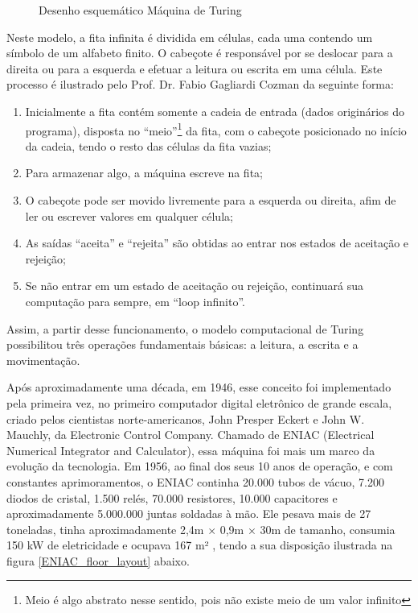 \vspace{1cm}
\begin{figure}[H] \centering 
  \caption{\label{turing_machine} Desenho esquemático Máquina de Turing} 
\end{figure}

Neste modelo, a fita infinita é dividida em células, cada uma contendo um símbolo de um alfabeto finito. O cabeçote é responsável por se deslocar para a direita ou para a esquerda e efetuar a leitura ou escrita em uma célula. Este processo é ilustrado pelo Prof. Dr. Fabio Gagliardi Cozman \cite{7} da seguinte forma:

\begin{enumerate}
  \item Inicialmente a fita contém somente a cadeia de entrada (dados originários do programa), disposta no ``meio''\footnote{Meio é algo abstrato nesse sentido, pois não existe meio de um valor infinito} da fita, com o cabeçote posicionado no início da cadeia, tendo o resto das células da fita vazias;
  \item Para armazenar algo, a máquina escreve na fita;
  \item O cabeçote pode ser movido livremente para a esquerda ou direita, afim de ler ou escrever valores em qualquer célula;
  \item As saídas ``aceita'' e ``rejeita'' são obtidas ao entrar nos estados de aceitação e rejeição;
  \item Se não entrar em um estado de aceitação ou rejeição, continuará sua computação para sempre, em ``loop infinito''.
\end{enumerate}

Assim, a partir desse funcionamento, o modelo computacional de Turing possibilitou três operações fundamentais básicas: a leitura, a escrita e a movimentação.   

Após aproximadamente uma década, em 1946, esse conceito foi implementado pela primeira vez, no primeiro computador digital eletrônico de grande escala, criado pelos cientistas norte-americanos, John Presper Eckert e John W. Mauchly, da Electronic Control Company. Chamado de ENIAC (Electrical Numerical Integrator and Calculator), essa máquina foi mais um marco da evolução da tecnologia. Em 1956, ao final dos seus 10 anos de operação, e com constantes aprimoramentos, o ENIAC continha 20.000 tubos de vácuo, 7.200 diodos de cristal, 1.500 relés, 70.000 resistores, 10.000 capacitores e aproximadamente 5.000.000 juntas soldadas à mão. Ele pesava mais de 27 toneladas, tinha aproximadamente 2,4m × 0,9m × 30m de tamanho, consumia 150 kW de eletricidade e ocupava 167 m² \cite{2}, tendo a sua disposição ilustrada na figura \ref{ENIAC_floor_layout} abaixo. 

